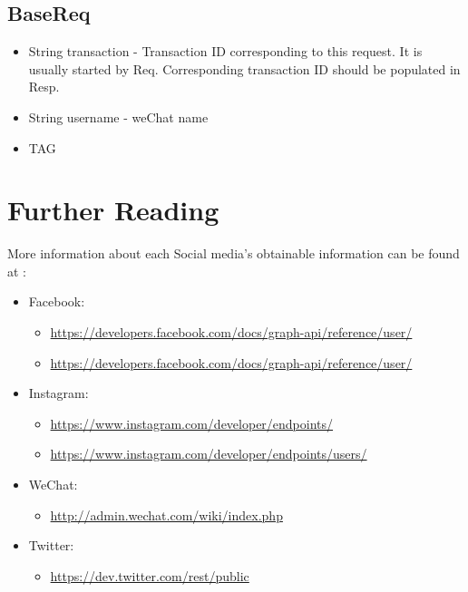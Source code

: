 \documentclass{article}
\begin{document}
\subsection{BaseReq}
\begin{itemize}
	\item String transaction - Transaction ID corresponding to this request. It is usually started by Req. Corresponding transaction ID should be populated in Resp. 
	\item String username - weChat name
	\item TAG
\end{itemize}

\cleardoublepage
\section{Further Reading}
More information about each Social media's obtainable information can be found at :
\begin{itemize}
\item Facebook:
\begin{itemize}
\item \href{https://developers.facebook.com/docs/graph-api/reference/user/}{https://developers.facebook.com/docs/graph-api/reference/user/}
\item \href{https://developers.facebook.com/docs/graph-api/reference}{https://developers.facebook.com/docs/graph-api/reference/user/}
\end{itemize}

\item Instagram:
\begin{itemize}
\item \href{https://www.instagram.com/developer/endpoints/}{https://www.instagram.com/developer/endpoints/}
\item \href{https://www.instagram.com/developer/endpoints/users/}{https://www.instagram.com/developer/endpoints/users/}
\end{itemize}

\item WeChat:
\begin{itemize}
\item \href{http://admin.wechat.com/wiki/index.php?title=Main_Page}{http://admin.wechat.com/wiki/index.php}
\end{itemize}

\item Twitter:
\begin{itemize}
\item \href{https://dev.twitter.com/rest/public}{https://dev.twitter.com/rest/public}
\end{itemize}

\end{itemize}
\end{document}

